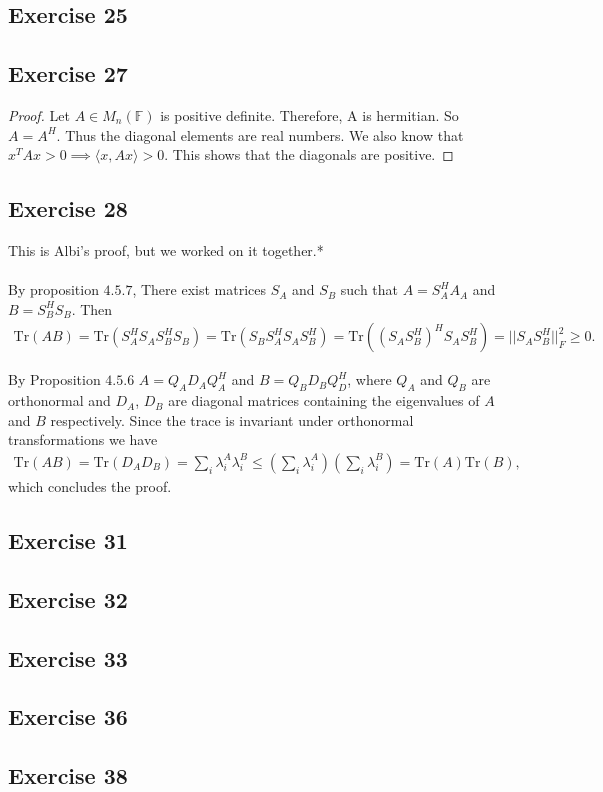 \documentclass[11.5pt, letterpaper, bibtotoc,
    tablecaptionabove, figurecaptionabove]{article}
\begin{document}
\subsection*{Exercise 25}

\subsection*{Exercise 27}
\begin{proof}
	Let $A \in M_n(\mathbb F)$ is positive definite.  Therefore, A is hermitian.  So $A=A^H$. Thus the diagonal elements are real numbers.  We also know that $x^TAx > 0 \implies \langle x, Ax\rangle > 0$.  This shows that the diagonals are positive.  
\end{proof}

\subsection*{Exercise 28}
This is Albi's proof, but we worked on it together.*\\
\\
By proposition $4.5.7$, There exist matrices $S_A$ and $S_B$ 
such that $A=S_A^HA_A$ and $B = S_B^HS_B$.
Then 
\begin{align*}
    \text{Tr}(AB) = \text{Tr}(S_A^HS_AS_B^HS_B) =
    \text{Tr}(S_BS_A^HS_AS_B^H) = \text{Tr}((S_AS_B^H)^HS_AS_B^H)
    = ||S_AS_B^H||_F^2\geq 0.
\end{align*}

By Proposition $4.5.6$ $A=Q_AD_AQ_A^H$ and $B=Q_BD_BQ_D^H$, where $Q_A$ and $Q_B$
are orthonormal and $D_A$, $D_B$ are diagonal matrices containing the eigenvalues
of $A$ and $B$ respectively.
Since the trace is invariant under orthonormal transformations we have
\begin{align*}
    \text{Tr}(AB)=\text{Tr}(D_AD_B)=\sum_i\lambda_i^A\lambda_i^B\leq
    \left(\sum_i\lambda_i^A\right)\left(\sum_i\lambda_i^B\right)=\text{Tr}(A)\text{Tr}(B),
\end{align*}
which concludes the proof.

\subsection*{Exercise 31}
\subsection*{Exercise 32}
\subsection*{Exercise 33}
\subsection*{Exercise 36}
\subsection*{Exercise 38}
\end{document}
